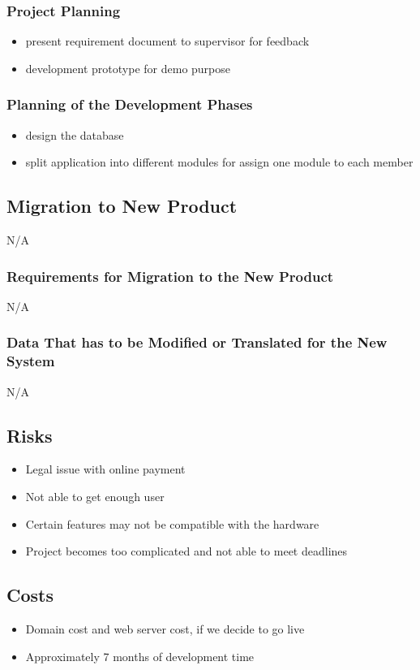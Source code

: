 \documentclass[12pt, titlepage]{article}
\begin{document}
{\subsubsection{Project Planning}
\begin{itemize}
  \item present requirement document to supervisor for feedback
  \item development prototype for demo purpose
\end{itemize}
\subsubsection{Planning of the Development Phases}
\begin{itemize}
    \item design the database
    \item split application into different modules for assign one module to each member
\end{itemize}
\subsection{Migration to New Product}
N/A
\subsubsection{Requirements for Migration to the New Product}
N/A
\subsubsection{Data That has to be Modified or Translated for the New System}
N/A
\subsection{Risks}
\begin{itemize}
  \item Legal issue with online payment
  \item Not able to get enough user
  \item Certain features may not be compatible with the hardware
  \item Project becomes too complicated and not able to meet deadlines
\end{itemize}
\subsection{Costs}
\begin{itemize}
  \item Domain cost and web server cost, if we decide to go live
  \item Approximately 7 months of development time
\end{itemize}
}
\end{document}

